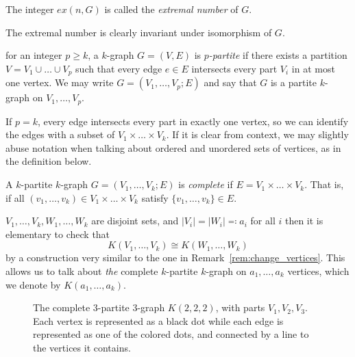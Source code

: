 \begin {definition}
    The integer $ex(n, G)$ is called the \emph{extremal number} of $G$.
\end{definition}

\begin{remark}
    The extremal number is clearly invariant under isomorphism of $G$.
\end{remark}

\begin{definition}
    for an integer $p \geq k$, a $k$-graph $G = (V, E)$ is \emph{$p$-partite}
    if there exists a partition $V = V_1 \cup \dots \cup V_p$
    such that every edge $e \in E$ intersects every part $V_i$ in at most one vertex.
    We may write $G = (V_1, \dots, V_p; E)$ and say that
    $G$ is a partite $k$-graph on $V_1, \dots, V_p$.
\end{definition}


\begin{remark}\label{rem:ordered}
    If $p=k$, every edge intersects every part in exactly one vertex,
    so we can identify the edges with a subset of $ V_1 \times \dots \times V_k$.
    If it is clear from context, we may slightly abuse notation when talking about ordered and
    unordered sets of vertices, as in the definition below.
\end{remark}

\begin{definition}
    A $k$-partite $k$-graph $G = (V_1, \dots, V_k; E)$ is \emph{complete}
    if $E = V_1 \times \dots \times V_k$.
    That is, if all $(v_1, \dots, v_k) \in V_1 \times \dots \times V_k$
    satisfy $\{v_1, \dots, v_k\} \in E$.
\end{definition}

\begin{remark}
    $V_1, \dots, V_k, W_1, \dots, W_k$ are disjoint sets,
    and $|V_i| = |W_i| \eqqcolon a_i$ for all $i$ then it is elementary to check that
    \[
        K(V_1, \dots, V_k) \cong K(W_1, \dots, W_k)
    \]
    by a construction very similar to the one in Remark~\ref{rem:change_vertices}.
    This allows us to talk about \emph{the} complete $k$-partite $k$-graph on
    $a_1, \dots, a_k$ vertices, which we denote by $K(a_1, \dots, a_k)$.
\end{remark}

\begin{figure}[H]
    \centering
    
    \caption{The complete 3-partite 3-graph $K(2, 2, 2)$, with parts $V_1, V_2, V_3$.
    Each vertex is represented as a black dot while
    each edge is represented as one of the colored dots, and connected by a line to the vertices it contains.}
    \label{fig:222}
\end{figure}

